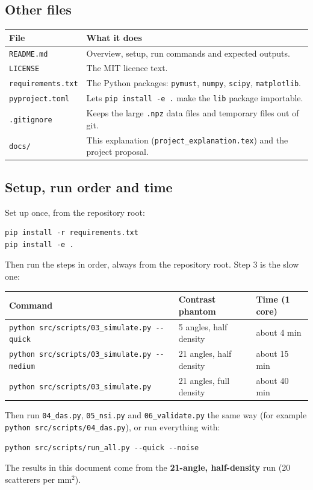 \documentclass[11pt,a4paper]{article}
\newcommand{\file}[1]{\texttt{#1}}
\begin{document}
\subsection{Other files}
\begin{center}
\small
\begin{tabular}{@{}p{3.6cm}p{11.0cm}@{}}
\toprule
\textbf{File} & \textbf{What it does}\\
\midrule
\file{README.md} & Overview, setup, run commands and expected outputs.\\
\file{LICENSE} & The MIT licence text.\\
\file{requirements.txt} & The Python packages: \texttt{pymust}, \texttt{numpy}, \texttt{scipy}, \texttt{matplotlib}.\\
\file{pyproject.toml} & Lets \texttt{pip install -e .} make the \texttt{lib} package importable.\\
\file{.gitignore} & Keeps the large \file{.npz} data files and temporary files out of git.\\
\file{docs/} & This explanation (\file{project\_explanation.tex}) and the project proposal.\\
\bottomrule
\end{tabular}
\end{center}

\subsection{Setup, run order and time}
Set up once, from the repository root:
\begin{verbatim}
pip install -r requirements.txt
pip install -e .
\end{verbatim}
Then run the steps in order, always from the repository root. Step 3 is the slow one:
\begin{center}
\small
\begin{tabular}{@{}p{7.4cm}p{3.6cm}p{3.1cm}@{}}
\toprule
\textbf{Command} & \textbf{Contrast phantom} & \textbf{Time (1 core)}\\
\midrule
\texttt{python src/scripts/03\_simulate.py -{}-quick} & 5 angles, half density & about 4 min\\
\texttt{python src/scripts/03\_simulate.py -{}-medium} & 21 angles, half density & about 15 min\\
\texttt{python src/scripts/03\_simulate.py} & 21 angles, full density & about 40 min\\
\bottomrule
\end{tabular}
\end{center}
Then run \file{04\_das.py}, \file{05\_nsi.py} and \file{06\_validate.py} the same way (for example \texttt{python src/scripts/04\_das.py}), or run everything with:
\begin{verbatim}
python src/scripts/run_all.py --quick --noise
\end{verbatim}
The results in this document come from the \textbf{21-angle, half-density} run (20 scatterers per mm$^2$).
\end{document}
